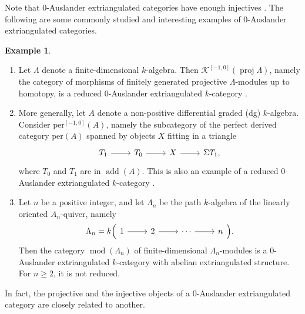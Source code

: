 \documentclass[10pt,twoside, a4paper,reqno]{amsart}
\DeclareMathOperator{\mods}{mod}
\DeclareMathOperator{\add}{add}
\DeclareMathOperator{\proj}{proj}
\newcommand{\Ktwo}{\mathcal{K}^{[-1,0]}}
\newcommand{\per}{\mathrm{per}}
\newcommand{\pertwo}{\mathrm{per}^{[-1,0]}}
\theoremstyle{definition}
\newtheorem{example}[theorem]{Example}
\begin{document}
Note that 0-Auslander extriangulated categories have enough injectives \cite[Prop. 3.6]{GNP23}. The following are some commonly studied and interesting examples of 0-Auslander extriangulated categories.

\begin{example}\label{eq:0Aus}
\,
\begin{enumerate}
    \item\label{eg:0Aus_K2} Let $\Lambda$ denote a finite-dimensional $k$-algebra. Then $\Ktwo(\proj\Lambda)$, namely the category of morphisms of finitely generated projective $\Lambda$-modules up to homotopy, is a reduced 0-Auslander extriangulated $k$-category \cite[§3.3.3]{GNP23}.
	\item\label{eg:0Aus_per2} 
    More generally, let $A$ denote a non-positive {differential graded (}dg{)} $k$-algebra.
    Consider $\pertwo(A)$, namely the subcategory of the {perfect} derived category {$\per(A)$} spanned by objects $X$ fitting in a triangle
    \begin{equation*}
    \begin{tikzcd}
        T_1\arrow[r] & T_0\arrow[r] & X \arrow[r] & \Sigma T_1, 
    \end{tikzcd}
    \end{equation*}
    where $T_0$ and $T_1$ are in $\add(A)$.
    This is also an example of a reduced 0-Auslander extriangulated $k$-category \cite[§3.3.8]{GNP23}. 
	\item\label{eg:0Aus_mod} 
	Let $n$ be a positive integer, and let $\Lambda_n$ be the path $k$-algebra of the linearly oriented $A_n$-quiver, namely
	\begin{equation*}
	\Lambda_n = k \Big( \begin{tikzcd}
	1\arrow[r] & 2 \arrow[r] & \cdots \arrow[r] & n
	\end{tikzcd}\Big).
	\end{equation*}
	Then the category $\mods(\Lambda_n)$ of finite-dimensional $\Lambda_n$-modules is a 0-Auslander extriangulated $k$-category \cite[§3.3.2]{GNP23} with abelian extriangulated structure. For $n\geq 2$, it is not reduced.
\end{enumerate}
\end{example}

In fact, the projective and the injective objects of a 0-Auslander extriangulated category are closely related to another.
\end{document}
